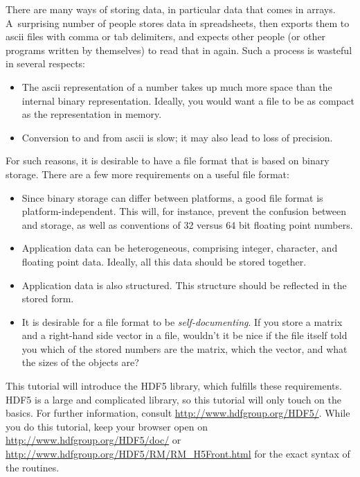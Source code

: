 
There are many ways of storing data, in particular data that comes in
arrays. A~surprising number of people stores data in spreadsheets,
then exports them to ascii files with comma or tab delimiters, and expects other
people (or other programs written by themselves) to read that in
again. Such a process is wasteful in several respects:
\begin{itemize}
\item The ascii representation of a number takes up much more space
  than the internal binary representation. Ideally, you would want a
  file to be as compact as the representation in memory.
\item Conversion to and from ascii is slow; it may also lead to loss
  of precision.
\end{itemize}
For such reasons, it is desirable to have a file format that is based
on binary storage. There are a few more requirements on a useful file
format:
\begin{itemize}
\item Since binary storage can differ between platforms, a good file
  format is platform-independent. This will, for instance, prevent the
  confusion between  and
   storage, as well as conventions of 32
  versus 64 bit floating point numbers.  
\item Application data can be heterogeneous, comprising integer,
  character, and floating point data. Ideally, all this data should be
  stored together.
\item Application data is also structured. This structure should be
  reflected in the stored form.
\item It is desirable for a file format to be
  \emph{self-documenting}. If you store a matrix and a right-hand side
  vector in a file, wouldn't it be nice if the file itself told you
  which of the stored numbers are the matrix, which the vector, and
  what the sizes of the objects are?
\end{itemize}
This tutorial will introduce the HDF5 library, which fulfills these
requirements. HDF5 is a large and complicated library, so this
tutorial will only touch on the basics. For
further information, consult \url{http://www.hdfgroup.org/HDF5/}.
While you do this tutorial, keep your browser open on
\url{http://www.hdfgroup.org/HDF5/doc/} or
\url{http://www.hdfgroup.org/HDF5/RM/RM_H5Front.html} 
for the exact
syntax of the routines.

